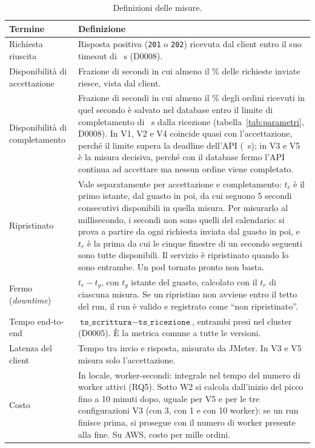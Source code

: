 \begin{table}[htbp]
\centering
\caption{Definizioni delle misure.}
\label{tab:definizioni}
\begin{tabularx}{\linewidth}{@{}>{\raggedright\arraybackslash}p{3.6cm}L@{}}
\toprule
\textbf{Termine} & \textbf{Definizione} \\
\midrule
Richiesta riuscita & Risposta positiva (\texttt{201} o \texttt{202}) ricevuta dal client entro il suo timeout di ~s (D0008). \\
Disponibilità di accettazione & Frazione di secondi in cui almeno il \% delle richieste inviate riesce, vista dal client. \\
Disponibilità di completamento & Frazione di secondi in cui almeno il \% degli ordini ricevuti in quel secondo è salvato nel database entro il limite di completamento di ~s dalla ricezione (tabella~\ref{tab:parametri}, D0008). In V1, V2 e V4 coincide quasi con l'accettazione, perché il limite supera la deadline dell'API (~s); in V3 e V5 è la misura decisiva, perché con il database fermo l'API continua ad accettare ma nessun ordine viene completato. \\
Ripristinato & Vale separatamente per accettazione e completamento: $t_r$ è il primo istante, dal guasto in poi, da cui seguono 5 secondi consecutivi disponibili in quella misura. Per misurarlo al millisecondo, i secondi non sono quelli del calendario: si prova a partire da ogni richiesta inviata dal guasto in poi, e $t_r$ è la prima da cui le cinque finestre di un secondo seguenti sono tutte disponibili. Il servizio è ripristinato quando lo sono entrambe. Un pod tornato pronto non basta. \\
Fermo (\textit{downtime}) & $t_r - t_g$, con $t_g$ istante del guasto, calcolato con il $t_r$ di ciascuna misura. Se un ripristino non avviene entro il tetto del run, il run è valido e registrato come ``non ripristinato''. \\
Tempo end-to-end & $\texttt{ts\_scrittura} - \texttt{ts\_ricezione}$, entrambi presi nel cluster (D0005). È la metrica comune a tutte le versioni. \\
Latenza del client & Tempo tra invio e risposta, misurato da JMeter. In V3 e V5 misura solo l'accettazione. \\
Costo & In locale, worker-secondi: integrale nel tempo del numero di worker attivi (RQ5). Sotto W2 si calcola dall'inizio del picco fino a 10 minuti dopo, uguale per V5 e per le tre configurazioni V3 (con 3, con 1 e con 10 worker): se un run finisce prima, si prosegue con il numero di worker presente alla fine. Su AWS, costo per mille ordini. \\
\bottomrule
\end{tabularx}
\end{table}


